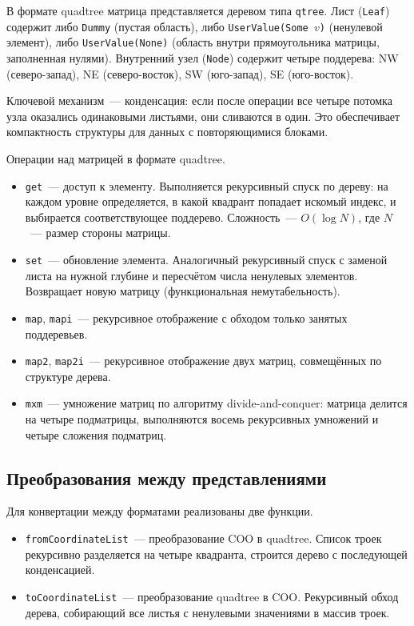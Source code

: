 \documentclass[a4paper]{article}
\begin{document}
В формате quadtree матрица представляется деревом типа \texttt{qtree}. Лист (\texttt{Leaf}) содержит либо \texttt{Dummy} (пустая область), либо \texttt{UserValue(Some~$v$)} (ненулевой элемент), либо \texttt{UserValue(None)} (область внутри прямоугольника матрицы, заполненная нулями). Внутренний узел (\texttt{Node}) содержит четыре поддерева: NW (северо-запад), NE (северо-восток), SW (юго-запад), SE (юго-восток).

Ключевой механизм~--- конденсация: если после операции все четыре потомка узла оказались одинаковыми листьями, они сливаются в один. Это обеспечивает компактность структуры для данных с повторяющимися блоками.

Операции над матрицей в формате quadtree.

\begin{itemize}
    \item \texttt{get}~--- доступ к элементу. Выполняется рекурсивный спуск по дереву: на каждом уровне определяется, в какой квадрант попадает искомый индекс, и выбирается соответствующее поддерево. Сложность~--- $O(\log N)$, где $N$~--- размер стороны матрицы.
    \item \texttt{set}~--- обновление элемента. Аналогичный рекурсивный спуск с заменой листа на нужной глубине и пересчётом числа ненулевых элементов. Возвращает новую матрицу (функциональная немутабельность).
    \item \texttt{map}, \texttt{mapi}~--- рекурсивное отображение с обходом только занятых поддеревьев.
    \item \texttt{map2}, \texttt{map2i}~--- рекурсивное отображение двух матриц, совмещённых по структуре дерева.
    \item \texttt{mxm}~--- умножение матриц по алгоритму divide-and-conquer: матрица делится на четыре подматрицы, выполняются восемь рекурсивных умножений и четыре сложения подматриц.
\end{itemize}

\subsection{Преобразования между представлениями}

Для конвертации между форматами реализованы две функции.

\begin{itemize}
    \item \texttt{fromCoordinateList}~--- преобразование COO в quadtree. Список троек рекурсивно разделяется на четыре квадранта, строится дерево с последующей конденсацией.
    \item \texttt{toCoordinateList}~--- преобразование quadtree в COO. Рекурсивный обход дерева, собирающий все листья с ненулевыми значениями в массив троек.
\end{itemize}
\end{document}
